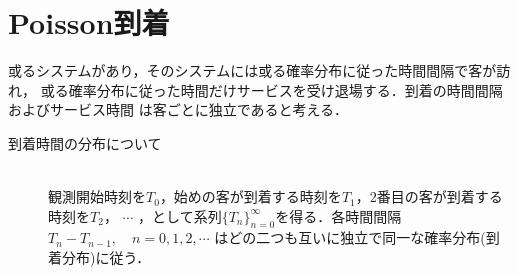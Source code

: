 \documentclass[a4j,papersize,disablejfam,slide,14pt]{jsarticle}
\begin{document}
\section{{\rm Poisson}到着}
    \begin{screen}
    或るシステムがあり，そのシステムには或る確率分布に従った時間間隔で客が訪れ，
    或る確率分布に従った時間だけサービスを受け退場する．到着の時間間隔およびサービス時間
    は客ごとに独立であると考える．
    \end{screen}
    \begin{description}
    	\item[到着時間の分布について]\mbox{}\\
    	観測開始時刻を$T_0$，始めの客が到着する時刻を$T_1$，$2$番目の客が到着する時刻を$T_2$，
    	$\cdots$ ，として系列$\{T_n\}_{n=0}^{\infty}$を得る．各時間間隔$T_n - T_{n-1},\quad n=0,1,2,\cdots$
    	はどの二つも互いに独立で同一な確率分布(到着分布)に従う．
    \end{description}
\end{document}
